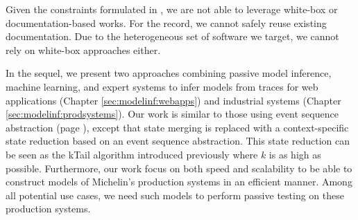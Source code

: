 Given the constraints formulated in
, we are not able to
leverage white-box or documentation-based works. For the record,
we cannot safely reuse existing documentation. Due to the
heterogeneous set of software we target, we cannot rely on
white-box approaches either.

In the sequel, we present two approaches combining passive model
inference, machine learning, and expert systems to infer models
from traces for web applications (Chapter
\ref{sec:modelinf:webapps}) and industrial systems (Chapter
\ref{sec:modelinf:prodsystems}).  Our work is similar to those
using event sequence abstraction (page
\pageref{sec:passive-fsa}), except that state merging is replaced
with a context-specific state reduction based on an event
sequence abstraction. This state reduction can be seen as the
kTail algorithm introduced previously where $k$ is as high as
possible. Furthermore, our work focus on both speed and
scalability to be able to construct models of Michelin's
production systems in an efficient manner. Among all potential
use cases, we need such models to perform passive testing on
these production systems.
